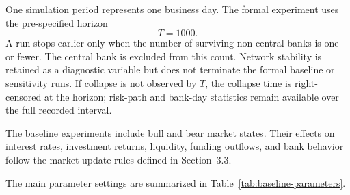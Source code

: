 One simulation period represents one business day. The formal experiment
uses the pre-specified horizon
\begin{equation}
T=1000.
\end{equation}
A run stops earlier only when the number of surviving non-central banks is
one or fewer. The central bank is excluded from this count. Network
stability is retained as a diagnostic variable but does not terminate the
formal baseline or sensitivity runs. If collapse is not observed by
\(T\), the collapse time is right-censored at the horizon; risk-path and
bank-day statistics remain available over the full recorded interval.

The baseline experiments include bull and bear market states. Their
effects on interest rates, investment returns, liquidity, funding
outflows, and bank behavior follow the market-update rules defined in
Section~3.3.

The main parameter settings are summarized in
Table~\ref{tab:baseline-parameters}.

